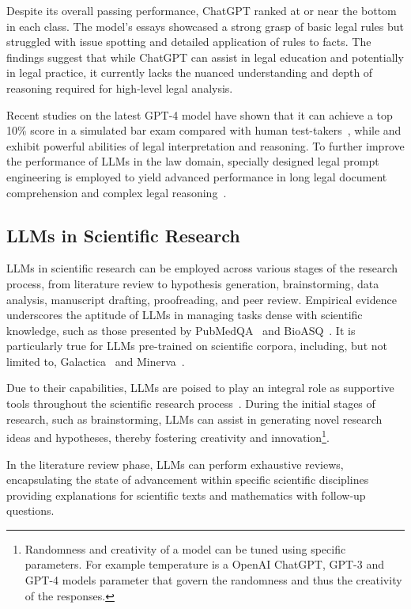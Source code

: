 Despite its overall passing performance, ChatGPT ranked at or near the bottom in each class.
The model's essays showcased a strong grasp of basic legal rules but struggled with issue spotting and detailed application of rules to facts.
The findings suggest that while ChatGPT can assist in legal education and potentially in legal practice, it currently lacks the nuanced understanding and depth of reasoning required for high-level legal analysis.

Recent studies on the latest GPT-4 model have shown that it can achieve a top 10\% score in a simulated bar exam compared with human test-takers~\cite{openai2024gpt4}, while \textcite{nay2022lawinformscode} and exhibit powerful abilities of legal interpretation and reasoning.
To further improve the performance of LLMs in the law domain, specially designed legal prompt engineering is employed to yield advanced performance in long legal document comprehension and complex legal reasoning~\cite{survey}.


\subsection{LLMs in Scientific Research}
\label{subsec:llms-in-scientific-research}

LLMs in scientific research can be employed across various stages of the research process, from literature review to hypothesis generation, brainstorming, data analysis, manuscript drafting, proofreading, and peer review.
Empirical evidence underscores the aptitude of LLMs in managing tasks dense with scientific knowledge, such as those presented by PubMedQA~\cite{jin2019pubmedqa} and BioASQ~\cite{krithara2022bioasq}.
It is particularly true for LLMs pre-trained on scientific corpora, including, but not limited to, Galactica~\cite{taylor2022galactica} and Minerva~\cite{lewkowycz2022minerva}.

Due to their capabilities, LLMs are poised to play an integral role as supportive tools throughout the scientific research process~\cite{zhang2023smallstep}.
During the initial stages of research, such as brainstorming, LLMs can assist in generating novel research ideas and hypotheses, thereby fostering creativity and innovation\footnote{Randomness and creativity of a model can be tuned using specific parameters. For example temperature is a OpenAI ChatGPT, GPT-3 and GPT-4 models parameter that govern the randomness and thus the creativity of the responses.}.

In the literature review phase, LLMs can perform exhaustive reviews, encapsulating the state of advancement within specific scientific disciplines~\cite{haman2023usingchatgpt, aydin2022openaichatgpt} providing explanations for scientific texts and mathematics with follow-up questions.

